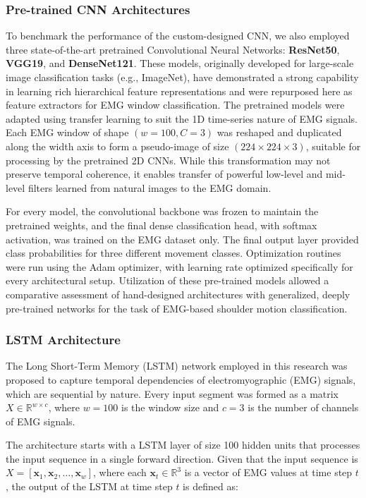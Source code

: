 \documentclass{elektr}
\begin{document}
\subsubsection{Pre-trained CNN Architectures}
To benchmark the performance of the custom-designed CNN, we also employed three state-of-the-art pretrained Convolutional Neural Networks: \textbf{ResNet50}, \textbf{VGG19}, and \textbf{DenseNet121}. These models, originally developed for large-scale image classification tasks (e.g., ImageNet), have demonstrated a strong capability in learning rich hierarchical feature representations and were repurposed here as feature extractors for EMG window classification. The pretrained models were adapted using transfer learning to suit the 1D time-series nature of EMG signals.
Each EMG window of shape $(w = 100, C = 3)$ was reshaped and duplicated along the width axis to form a pseudo-image of size $(224 \times 224 \times 3)$, suitable for processing by the pretrained 2D CNNs. While this transformation may not preserve temporal coherence, it enables transfer of powerful low-level and mid-level filters learned from natural images to the EMG domain.


For every model, the convolutional backbone was frozen to maintain the pretrained weights, and the final dense classification head, with softmax activation, was trained on the EMG dataset only. The final output layer provided class probabilities for three different movement classes. Optimization routines were run using the Adam optimizer, with learning rate optimized specifically for every architectural setup. Utilization of these pre-trained models allowed a comparative assessment of hand-designed architectures with generalized, deeply pre-trained networks for the task of EMG-based shoulder motion classification.


\subsubsection{LSTM Architecture}

The Long Short-Term Memory (LSTM) network employed in this research was proposed to capture temporal dependencies of electromyographic (EMG) signals, which are sequential by nature. Every input segment was formed as a matrix $X \in \mathbb{R}^{w \times c}$, where $w = 100$ is the window size and $c = 3$ is the number of channels of EMG signals.

The architecture starts with a LSTM layer of size 100 hidden units that processes the input sequence in a single forward direction. Given that the input sequence is $X = [\mathbf{x}_1, \mathbf{x}_2, \ldots, \mathbf{x}_w]$, where each $\mathbf{x}_t \in \mathbb{R}^3$ is a vector of EMG values at time step $t$, the output of the LSTM at time step $t$ is defined as:
\end{document}
